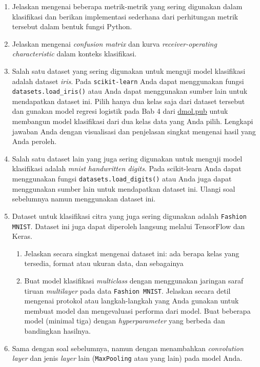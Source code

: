 \documentclass[a4paper,11pt]{article} %
\newcommand{\pyinline}[1]{\texttt{#1}}
\begin{document}
\begin{enumerate}
%
%
\item Jelaskan mengenai beberapa metrik-metrik yang sering digunakan dalam
klasifikasi dan berikan implementasi sederhana dari perhitungan
metrik tersebut dalam bentuk fungsi Python.
%
%
\item Jelaskan mengenai \textit{confusion matrix} dan
kurva \textit{receiver-operating characteristic} dalam konteks klasifikasi.
%
%
\item Salah satu dataset yang sering digunakan untuk menguji model klasifikasi
adalah dataset \textit{iris}.
Pada
\pyinline{scikit-learn} Anda dapat menggunakan fungsi \pyinline{datasets.load_iris()}
atau Anda dapat menggunakan sumber lain untuk mendapatkan dataset ini.
Pilih hanya dua
kelas saja dari dataset tersebut dan gunakan model regresi logistik
pada Bab 4 dari \url{dmol.pub} untuk membangun model klasifikasi dari dua kelas data yang
Anda pilih. Lengkapi jawaban Anda dengan visualisasi dan penjelasan singkat mengenai
hasil yang Anda peroleh.
%
%
\item Salah satu dataset lain yang juga sering digunakan untuk menguji
model klasifikasi adalah \textit{mnist handwritten digits}. Pada
scikit-learn Anda dapat menggunakan fungsi \pyinline{datasets.load_digits()} atau
Anda juga dapat menggunakan sumber lain untuk mendapatkan dataset ini.
Ulangi soal sebelumnya namun menggunakan dataset ini.
%
%
\item Dataset untuk klasifikasi citra yang juga sering digunakan adalah
\pyinline{Fashion MNIST}. Dataset ini juga dapat diperoleh langsung
melalui TensorFlow dan Keras.
  \begin{enumerate}
    \item Jelaskan secara singkat mengenai dataset ini: ada berapa kelas
    yang tersedia, format atau ukuran data, dan sebagainya
    \item Buat model klasifikasi \textit{multiclass} dengan menggunakan
    jaringan saraf tiruan \textit{multilayer} pada data \pyinline{Fashion MNIST}.
    Jelaskan secara detil mengenai protokol atau langkah-langkah yang Anda gunakan untuk
    membuat model dan mengevaluasi performa dari model. Buat beberapa model (minimal tiga)
    dengan \textit{hyperparameter} yang berbeda dan bandingkan hasilnya.
  \end{enumerate}
%
%
\item Sama dengan soal sebelumnya, namun dengan menambahkan \textit{convolution layer}
dan jenis \textit{layer} lain (\pyinline{MaxPooling} atau yang lain) pada model Anda.

\end{enumerate}
\end{document}
